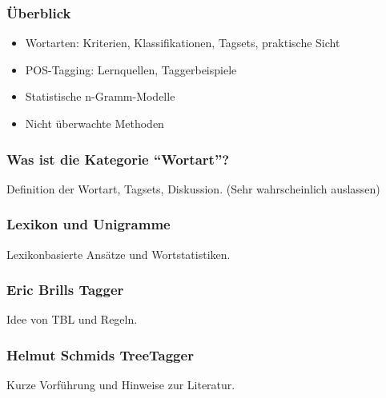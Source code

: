 \begin{frame}
  \frametitle{Überblick}
  \begin{itemize}
  \item Wortarten: Kriterien, Klassifikationen, Tagsets, praktische Sicht
  \item POS-Tagging: Lernquellen, Taggerbeispiele
  \item Statistische n-Gramm-Modelle
  \item Nicht überwachte Methoden
  \end{itemize}
\end{frame}

\begin{frame}
  \frametitle{Was ist die Kategorie "`Wortart"'?}
  Definition der Wortart, Tagsets, Diskussion.
  (Sehr wahrscheinlich auslassen)
\end{frame}

\begin{frame}
  \frametitle{Lexikon und Unigramme}
  Lexikonbasierte Ansätze und Wortstatistiken.
\end{frame}

\begin{frame}
  \frametitle{Eric Brills Tagger}
  Idee von TBL und Regeln.

\end{frame}

\begin{frame}
  \frametitle{Helmut Schmids TreeTagger}

  Kurze Vorführung und Hinweise zur Literatur.
\end{frame}

\frame{
  \nocite{*}
  \printbibliography
}



